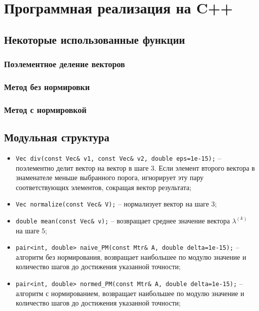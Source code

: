 \section{Программная реализация на C++}
\subsection{Некоторые использованные функции}
\subsubsection{Поэлементное деление векторов}


\subsubsection{Метод без нормировки}


\subsubsection{Метод с нормировкой}


\subsection{Модульная структура}

\begin{itemize}
    \item \lstinline|Vec div(const Vec& v1, const Vec& v2, double eps=1e-15);| -- поэлементно делит вектор на вектор в шаге 3. Если элемент второго вектора в знаменателе меньше выбранного порога, игнорирует эту пару соответствующих элементов, сокращая вектор результата;

    \item \lstinline|Vec normalize(const Vec& V);| -- нормализует вектор на шаге 3;

    \item \lstinline|double mean(const Vec& v);| -- возвращает среднее значение вектора $\lambda^{(k)}$ на шаге 5;

    \item \lstinline|pair<int, double> naive_PM(const Mtr& A, double delta=1e-15);| -- алгоритм без нормирования, возвращает наибольшее по модулю значение и количество шагов до достижения указанной точности;

    \item \lstinline|pair<int, double> normed_PM(const Mtr& A, double delta=1e-15);| -- алгоритм с нормированием, возвращает наибольшее по модулю значение и количество шагов до достижения указанной точности;
\end{itemize}
